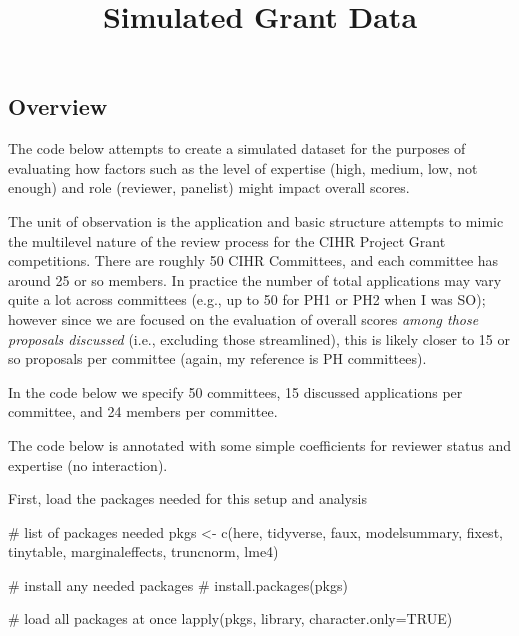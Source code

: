 \documentclass[
  letterpaper,
  DIV=11,
  numbers=noendperiod]{scrartcl}
\title{Simulated Grant Data}
\author{}
\date{}
\newenvironment{Shaded}{\begin{snugshade}}{\end{snugshade}}
\newcommand{\AttributeTok}[1]{\textcolor[rgb]{0.40,0.45,0.13}{#1}}
\newcommand{\CommentTok}[1]{\textcolor[rgb]{0.37,0.37,0.37}{#1}}
\newcommand{\ConstantTok}[1]{\textcolor[rgb]{0.56,0.35,0.01}{#1}}
\newcommand{\FunctionTok}[1]{\textcolor[rgb]{0.28,0.35,0.67}{#1}}
\newcommand{\NormalTok}[1]{\textcolor[rgb]{0.00,0.23,0.31}{#1}}
\newcommand{\OtherTok}[1]{\textcolor[rgb]{0.00,0.23,0.31}{#1}}
\newcommand{\StringTok}[1]{\textcolor[rgb]{0.13,0.47,0.30}{#1}}
\begin{document}
\maketitle


\subsection{Overview}\label{overview}

The code below attempts to create a simulated dataset for the purposes
of evaluating how factors such as the level of expertise (high, medium,
low, not enough) and role (reviewer, panelist) might impact overall
scores.

The unit of observation is the application and basic structure attempts
to mimic the multilevel nature of the review process for the CIHR
Project Grant competitions. There are roughly 50 CIHR Committees, and
each committee has around 25 or so members. In practice the number of
total applications may vary quite a lot across committees (e.g., up to
50 for PH1 or PH2 when I was SO); however since we are focused on the
evaluation of overall scores \emph{among those proposals discussed}
(i.e., excluding those streamlined), this is likely closer to 15 or so
proposals per committee (again, my reference is PH committees).

In the code below we specify 50 committees, 15 discussed applications
per committee, and 24 members per committee.

The code below is annotated with some simple coefficients for reviewer
status and expertise (no interaction).

First, load the packages needed for this setup and analysis

\begin{Shaded}
\begin{Highlighting}[]
\CommentTok{\# list of packages needed}
\NormalTok{pkgs }\OtherTok{\textless{}{-}} \FunctionTok{c}\NormalTok{(}\StringTok{\textquotesingle{}here\textquotesingle{}}\NormalTok{, }\StringTok{\textquotesingle{}tidyverse\textquotesingle{}}\NormalTok{, }\StringTok{\textquotesingle{}faux\textquotesingle{}}\NormalTok{, }\StringTok{\textquotesingle{}modelsummary\textquotesingle{}}\NormalTok{, }
  \StringTok{\textquotesingle{}fixest\textquotesingle{}}\NormalTok{, }\StringTok{\textquotesingle{}tinytable\textquotesingle{}}\NormalTok{, }\StringTok{\textquotesingle{}marginaleffects\textquotesingle{}}\NormalTok{,}
  \StringTok{\textquotesingle{}truncnorm\textquotesingle{}}\NormalTok{, }\StringTok{\textquotesingle{}lme4\textquotesingle{}}\NormalTok{)}

\CommentTok{\# install any needed packages}
\CommentTok{\# install.packages(pkgs)}

\CommentTok{\# load all packages at once}
\FunctionTok{lapply}\NormalTok{(pkgs, library, }\AttributeTok{character.only=}\ConstantTok{TRUE}\NormalTok{)}
\end{Highlighting}
\end{Shaded}
\end{document}
